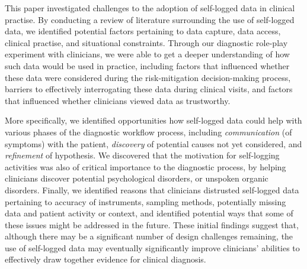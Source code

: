 \documentclass{sigchi}
\begin{document}


This paper investigated challenges to the adoption of self-logged data in clinical practise. By conducting a review of literature surrounding the use of self-logged data, we identified potential factors pertaining to data capture, data access, clinical practise, and situational constraints.  Through our diagnostic role-play experiment with clinicians, we were able to get a deeper understanding of how such data would be used in practice, including factors that influenced whether these data were considered during the risk-mitigation decision-making process, barriers to effectively interrogating  these data during clinical visits, and factors that influenced whether clinicians viewed data as trustworthy. 

More specifically, we identified opportunities how self-logged data could help with various phases of the diagnostic workflow process, including \emph{communication} (of symptoms) with the patient,  \emph{discovery} of potential causes not yet considered, and \emph{refinement} of hypothesis.  We discovered that the motivation for self-logging activities was also of critical importance to the diagnostic process, by helping clinicians discover potential psychological disorders, or unspoken organic disorders. Finally, we identified reasons that clinicians distrusted self-logged data pertaining to accuracy of instruments, sampling methods, potentially missing data and patient activity or context, and identified potential ways that some of these issues might be addressed in the future. These initial findings suggest that, although there may be a significant number of design challenges remaining, the use of self-logged data may eventually significantly improve clinicians' abilities to effectively draw together evidence for clinical diagnosis. %

\end{document}
